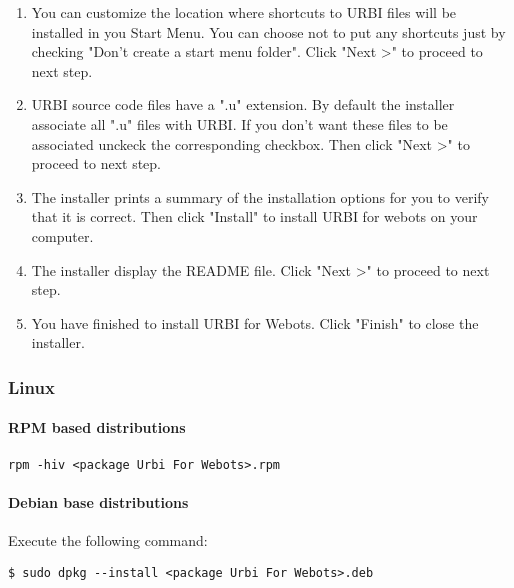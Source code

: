 \begin{enumerate}
\item You can customize the location where shortcuts to URBI files
  will be installed in you Start Menu. You can choose not to put any
  shortcuts just by checking "Don't create a start menu folder". Click
  "Next >{}" to proceed to next step.

\item URBI source code files have a ".u" extension. By default the
  installer associate all ".u" files with URBI. If you don't want
  these files to be associated unckeck the corresponding
  checkbox. Then click "Next >{}" to proceed to next step.

\item The installer prints a summary of the installation options for
  you to verify that it is correct. Then click "Install" to install
  URBI for webots on your computer.

\item The installer display the README file. Click "Next >{}" to
  proceed to next step.

\item You have finished to install URBI for Webots. Click "Finish" to
  close the installer.
\end{enumerate}

\subsubsection{Linux}
\label{webots.setup.linux}%

\paragraph{RPM based distributions}
\label{webots.setup.linux.rpm}%

\begin{lstlisting}[firstnumber=1,]
rpm -hiv <package Urbi For Webots>.rpm
\end{lstlisting}

\paragraph{Debian base distributions}
\label{webots.setup.linux.deb}%

Execute the following command:


\begin{lstlisting}[firstnumber=1,]
$ sudo dpkg --install <package Urbi For Webots>.deb
\end{lstlisting}

